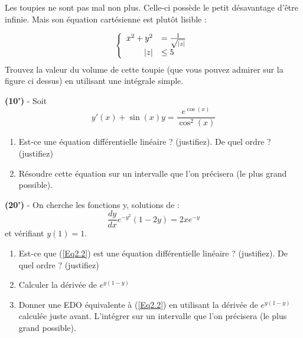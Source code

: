 \documentclass[10pt,a4paper,notitlepage]{article}
\begin{document}
\begin{definition}
Les toupies ne sont pas mal non plus. Celle-ci possède le petit désavantage d'être infinie. Mais son équation cartésienne est plutôt lisible :


\begin{equation*}
\left\{ 
        \begin{array}{rl}
    x^2+y^2&=\frac{1}{\sqrt{\abs{z}}}\\
    \abs{z}&\leq 5
    \end{array}
    \right.
\end{equation*}
Trouvez la valeur du volume de cette toupie (que vous pouvez admirer sur la figure ci dessus) en utilisant une intégrale simple.


\end{definition}
\begin{definition}[]
\hspace{0ex} \textbf{(10')} - Soit
\begin{equation}
y'(x)+\sin (x) y = \dfrac{e^{\cos(x)}}{\cos^2 (x)}
\end{equation}
\begin{enumerate}
\item Est-ce une équation différentielle linéaire ? (justifiez). De quel ordre ? (justifiez)
\item Résoudre cette équation sur un intervalle que l'on précisera (le plus grand possible).
\end{enumerate}

\end{definition}
\begin{definition}[]
\textbf{(20')} - On cherche les fonctions y, solutions de :
\begin{equation}
\label{Eq2.2}
\dfrac{dy}{dx}e^{-y^2}(1-2y)=2xe^{-y}
\end{equation}
et vérifiant $y(1)=1$.
\begin{enumerate}
\item Est-ce que (\ref{Eq2.2}) est une équation différentielle linéaire ? (justifiez). De quel ordre ? (justifiez)
\item Calculer la dérivée de $e^{y(1-y)}$
\item Donner une EDO équivalente à (\ref{Eq2.2}) en utilisant la dérivée de $e^{y(1-y)}$ calculée juste avant. L'intégrer sur un intervalle que l'on précisera (le plus grand possible).
\end{enumerate}


\end{definition}
\end{document}
